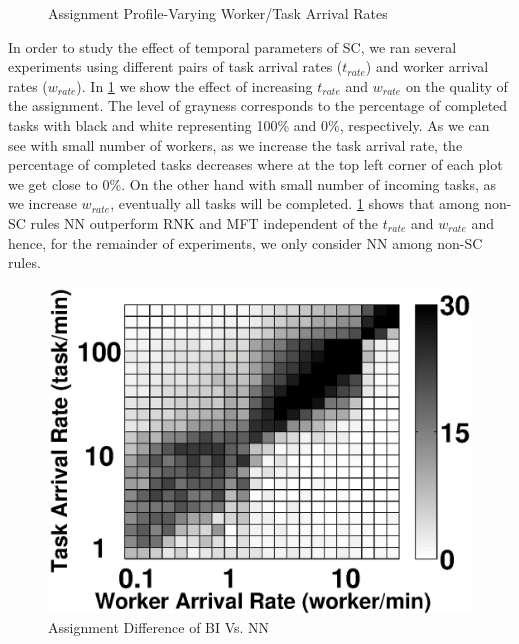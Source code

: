\begin{figure}[h]
{    }
    \vspace{-0.15in}
    \caption{\small{Assignment Profile-Varying Worker/Task Arrival Rates}}
    \label{fig:tw_rate}
\end{figure}

In order to study the effect of temporal parameters of SC, we ran several experiments using different pairs of task arrival rates ($t_{rate}$) and worker arrival rates ($w_{rate}$). In \cref{fig:tw_rate} we show the effect of increasing $t_{rate}$ and $w_{rate}$ on the quality of the assignment. The level of grayness corresponds to the percentage of completed tasks with black and white representing 100\% and 0\%, respectively. As we can see with small number of workers, as we increase the task arrival rate, the percentage of completed tasks decreases where at the top left corner of each plot we get close to 0\%. On the other hand with small number of incoming tasks, as we increase $w_{rate}$, eventually all tasks will be completed. \cref{fig:tw_rate} shows that among non-SC rules NN outperform RNK and MFT independent of the $t_{rate}$ and $w_{rate}$ and hence, for the remainder of experiments, we only consider NN among non-SC rules.

\begin{figure}[h]
	\centering
	\includegraphics[width = 0.65\columnwidth]{figures/bi_nn.eps}
	\vspace{-0.1in}
	\caption{Assignment Difference of BI Vs. NN}\label{fig:bi_nn}
\end{figure}

